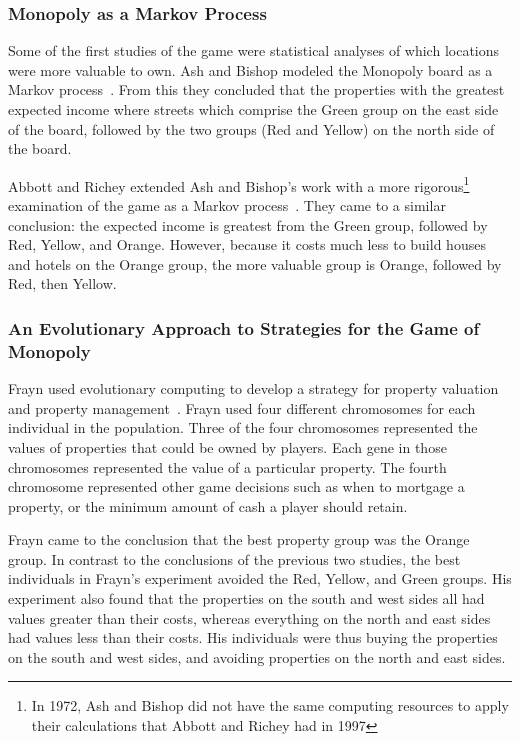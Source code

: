 \subsubsection{Monopoly as a Markov Process}

Some of the first studies of the game were statistical analyses of which
locations were more valuable to own. Ash and Bishop modeled the Monopoly board
as a Markov process~\cite{Ash1972}. From this they concluded that the properties
with the greatest expected income where streets which comprise the Green group
on the east side of the board, followed by the two groups (Red and Yellow) on
the north side of the board.

Abbott and Richey extended Ash and Bishop's work with a more
rigorous\footnote{In 1972, Ash and Bishop did not have the same computing
resources to apply their calculations that Abbott and Richey had in 1997}
examination of the game as a Markov process~\cite{Abbott1997}. They came to a
similar conclusion: the expected income is greatest from the Green group,
followed by Red, Yellow, and Orange. However, because it costs much less to
build houses and hotels on the Orange group, the more valuable group is Orange,
followed by Red, then Yellow.

\subsubsection{An Evolutionary Approach to Strategies for the Game of Monopoly}

Frayn used evolutionary computing to develop a strategy for property valuation
and property management~\cite{DBLP:conf/cig/Frayn05}. Frayn used four different
chromosomes for each individual in the population. Three of the four chromosomes
represented the values of properties that could be owned by players. Each gene
in those chromosomes represented the value of a particular property. The fourth
chromosome represented other game decisions such as when to mortgage a property,
or the minimum amount of cash a player should retain.

Frayn came to the conclusion that the best property group was the Orange group.
In contrast to the conclusions of the previous two studies, the best individuals
in Frayn's experiment avoided the Red, Yellow, and Green groups. His experiment
also found that the properties on the south and west sides all had values
greater than their costs, whereas everything on the north and east sides had
values less than their costs. His individuals were thus buying the properties on
the south and west sides, and avoiding properties on the north and east sides.

